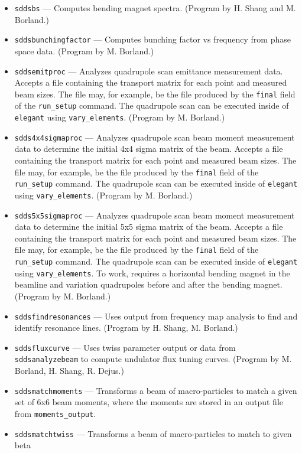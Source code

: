 \documentclass[11pt]{article}
\begin{document}
\begin{itemize}
\item {\tt sddsbs} --- Computes bending magnet spectra.
  (Program by H. Shang and M. Borland.)
\item {\tt sddsbunchingfactor} --- Computes bunching factor vs frequency from phase space data.
  (Program by M. Borland.)
\item {\tt sddsemitproc} --- Analyzes quadrupole scan emittance measurement data.  Accepts a
        file containing the transport matrix for each point and measured beam sizes.  
        The file may, for example, be the file produced
        by the {\tt final} field of the {\tt run\_setup} command.  The quadrupole scan can be
        executed inside of {\tt elegant} using {\tt vary\_elements}. (Program by M. Borland.)
\item {\tt sdds4x4sigmaproc} --- Analyzes quadrupole scan beam moment measurement data to determine
  the initial 4x4 sigma matrix of the beam.  Accepts a
  file containing the transport matrix for each point and measured beam sizes.  
  The file may, for example, be the file produced
  by the {\tt final} field of the {\tt run\_setup} command.  The quadrupole scan can be
  executed inside of {\tt elegant} using {\tt vary\_elements}. (Program by M. Borland.)
\item {\tt sdds5x5sigmaproc} --- Analyzes quadrupole scan beam moment measurement data to determine
  the initial 5x5 sigma matrix of the beam.  Accepts a
  file containing the transport matrix for each point and measured beam sizes.  
  The file may, for example, be the file produced
  by the {\tt final} field of the {\tt run\_setup} command.  The quadrupole scan can be
  executed inside of {\tt elegant} using {\tt vary\_elements}. To work, requires a horizontal bending magnet
  in the beamline and variation quadrupoles before and after the bending magnet. (Program by M. Borland.)
\item {\tt sddsfindresonances} --- Uses output from frequency map analysis to find and identify resonance lines.
 (Program by H. Shang, M. Borland.)
\item {\tt sddsfluxcurve} --- Uses twiss parameter output or data from {\tt sddsanalyzebeam} to
  compute undulator flux tuning curves.  (Program by M. Borland, H. Shang, R. Dejus.)
\item {\tt sddsmatchmoments} --- Transforms a beam of macro-particles to match a given set of 
  6x6 beam moments, where the moments are stored in an output file from \verb|moments_output|.
\item {\tt sddsmatchtwiss} --- Transforms a beam of macro-particles to match to given beta

\end{itemize}
\end{document}
